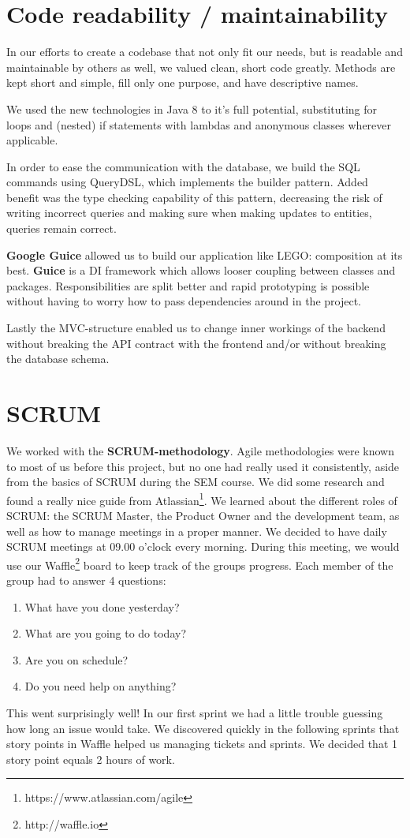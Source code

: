 \section{Code readability / maintainability}
In our efforts to create a codebase that not only fit our needs, but is readable and maintainable by others as well, we valued clean, short code greatly.
Methods are kept short and simple, fill only one purpose, and have descriptive names. 

We used the new technologies in Java 8 to it's full potential, substituting for loops and (nested) if statements with lambdas and anonymous classes wherever applicable.

In order to ease the communication with the database, we build the SQL commands using QueryDSL, which implements the builder pattern.
Added benefit was the type checking capability of this pattern, decreasing the risk of writing incorrect queries and making sure when making updates to entities, queries remain correct.

\textbf{Google Guice} allowed us to build our application like LEGO\texttrademark : composition at its best.
\textbf{Guice} is a \Gls{DI} framework which allows looser coupling between classes and packages.
Responsibilities are split better and rapid prototyping is possible without having to worry how to pass dependencies around in the project.

Lastly the MVC-structure enabled us to change inner workings of the backend without breaking the API contract with the frontend and/or without breaking the database schema.

\section{SCRUM}
We worked with the \textbf{SCRUM-methodology}.
Agile methodologies were known to most of us before this project, but no one had really used it consistently, aside from the basics of SCRUM during the SEM course.
We did some research and found a really nice guide from Atlassian\footnote{https://www.atlassian.com/agile}.
We learned about the different roles of SCRUM: the SCRUM Master, the Product Owner and the development team, as well as how to manage meetings in a proper manner.
We decided to have daily SCRUM meetings at 09.00 o'clock every morning.
During this meeting, we would use our Waffle\footnote{http://waffle.io} board to keep track of the groups progress.
Each member of the group had to answer 4 questions:
\begin{enumerate}
\item What have you done yesterday?
\item What are you going to do today?
\item Are you on schedule?
\item Do you need help on anything?
\end{enumerate}
This went surprisingly well!
In our first sprint we had a little trouble guessing how long an issue would take.
We discovered quickly in the following sprints that story points in Waffle helped us managing tickets and sprints.
We decided that 1 story point equals 2 hours of work.

